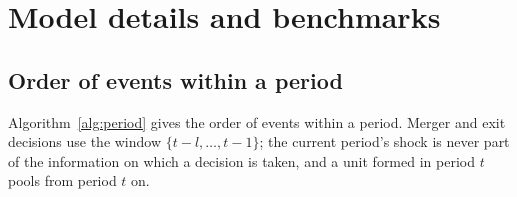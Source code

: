 \appendix
{}
\renewcommand{\thetable}{\thesection\arabic{table}}
\renewcommand{\thefigure}{\thesection\arabic{figure}}

\section{Model details and benchmarks}\label{app:model}

\subsection{Order of events within a period}\label{app:algorithm}

Algorithm~\ref{alg:period} gives the order of events within a period. Merger and exit decisions use the window $\{t-l, \dots, t-1\}$; the current period's shock is never part of the information on which a decision is taken, and a unit formed in period $t$ pools from period $t$ on.


